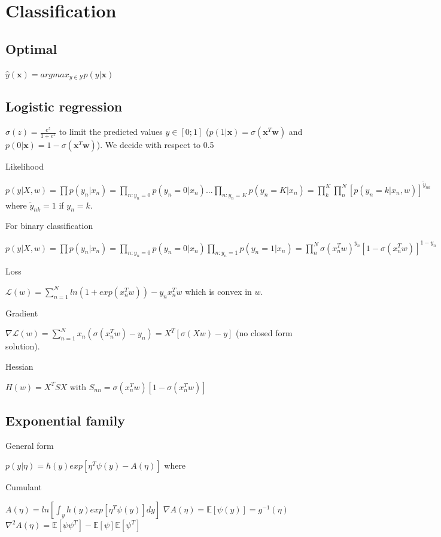 \section{Classification}
\subsection{Optimal}
$\hat{y}(\mathbf{x}) = argmax_{y\in \mathcal{Y}} p(y|\mathbf{x})$

\subsection{Logistic regression}
$\sigma(z) = \frac{e^z}{1+e^z}$ to limit the predicted values $y\in [0;1]$ ($p(1|\mathbf{x}) = \sigma(\mathbf{x}^T\mathbf{w})$ and $p(0|\mathbf{x}) = 1-\sigma(\mathbf{x}^T\mathbf{w})$). We decide with respect to 0.5

Likelihood

$p(y | X,w) = \prod p(y_n|x_n) = \prod_{n:y_n=0} p(y_n=0|x_n) ... \prod_{n:y_n=K} p(y_n=K|x_n) = \prod^K_k \prod^N_n [p(y_n = k | x_n,w)]^{\tilde{y}_{nk}}$ where ${\tilde{y}_{nk}} = 1$ if $y_n=k$.

For binary classification

$p(y | X, w) = \prod p(y_n|x_n) = \prod_{n:y_n=0} p(y_n=0|x_n) \prod_{n:y_n=1} p(y_n=1|x_n) = \prod^N_n \sigma({x_n^T w})^{y_n}[1-\sigma({x_n^T w})]^{1-y_n}$

Loss

$\mathcal{L}(w) = \sum_{n=1}^N ln(1 + exp(x_n^T w)) - y_n x_n^T w$ which is convex in $w$.

Gradient

$\nabla \mathcal{L}(w) = \sum_{n=1}^N x_n (\sigma(x_n^T w) - y_n) = X^T[\sigma(Xw) - y]$ (no closed form solution).

Hessian

$H(w) = X^T S X$ with $S_{nn} = \sigma(x_n^T w)[1-\sigma(x_n^T w)]$

\subsection{Exponential family}
General form

$p(y|\eta) = h(y) exp[\eta^T \psi(y) - A(\eta)]$ where

Cumulant

$A(\eta) = ln[\int_y h(y) exp[\eta^T \psi(y)] dy]$
\newline
$\nabla A(\eta) = \mathbb{E}[\psi(y)] = g^{-1}(\eta)$
\newline
$\nabla^2 A(\eta) = \mathbb{E}[\psi\psi^T] - \mathbb{E}[\psi]\mathbb{E}[\psi^T]$

